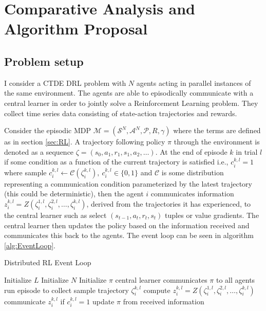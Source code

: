 \chapter{Comparative Analysis and Algorithm Proposal}

\section{Problem setup}

I consider a CTDE DRL problem with $N$ agents acting in parallel instances of the same environment.
The agents are able to episodically communicate with a central learner in order to jointly solve a Reinforcement Learning problem.
They collect time series data consisting of state-action trajectories and rewards.

Consider the episodic MDP $\mathcal{M}= (\mathcal{S}^N, \mathcal{A}^N, \mathcal{P}, R,\gamma)$ where the terms are defined as in section \ref{sec:RL}.
A trajectory following policy $\pi$ through the environment is denoted as a sequence $\zeta = (s_0, a_1, r_1, s_1, a_2, \dots)$.
At the end of episode $k$ in trial $l$ if some condition as a function of the current trajectory is satisfied i.e., $c^{k,l}_i=1$ where sample $c^{k,l}_i \leftarrow \mathcal{C}(\zeta^{k,l}_i), \ c^{k,l}_i \in \{0,1\}$ and $\mathcal{C}$ is some distribution representing a communication condition parameterized by the latest trajectory (this could be deterministic), then the agent $i$ communicates information $z^{k,l}_i=Z(\zeta^{1,l}_i,\zeta^{2,l}_i,\dots, \zeta^{k,l}_i)$, derived from the trajectories it has experienced, to the central learner such as select $(s_{t-1},a_t,r_t,s_t)$ tuples or value gradients.
The central learner then updates the policy based on the information received and communicates this back to the agents. 
The event loop can be seen in algorithm \ref{alg:EventLoop}.

\begin{algorithm}
    \caption{Distributed RL Event Loop}\label{alg:EventLoop}
    \begin{algorithmic}
            \State Initialize $L$ 
            \State Initialize $N$ 
            \State Initialize $\pi$
            \State central learner communicates $\pi$ to all agents
            \State run episode to collect sample trajectory $\zeta^{k,l}_i$ %
            \State compute $z^{k,l}_i = Z(\zeta^{1,l}_i,\zeta^{2,l}_i,\dots, \zeta^{k,l}_i)$
            \State communicate $z^{k,l}_i$ if $c^{k,l}_i = 1$
            \EndFor
            \State update $\pi$ from received information
            \EndFor
            \EndFor
    \end{algorithmic}
\end{algorithm}

